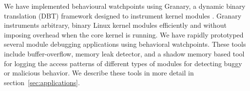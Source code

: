 \documentclass[letterpaper,twocolumn,10pt]{article}
\begin{document}



We have implemented behavioural watchpoints using Granary, a dynamic binary translation (DBT) framework designed to instrument kernel modules \cite{GranaryAtOSDI, DynamoRIOKernel}. Granary instruments arbitrary, binary Linux kernel modules efficiently and without imposing overhead when the core kernel is running. We have rapidly prototyped several module debugging applications using behavioral watchpoints. These tools include buffer-overflow, memory leak detector, and a shadow memory based tool for logging the access patterns of different types of modules for detecting buggy or malicious behavior. We describe these tools in more detail in section~\ref{sec:applications}.









\end{document}
